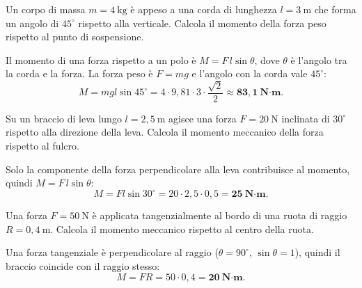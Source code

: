 
\begin{question}[ID=6.1, subtitle={Momento del peso su pendolo a 45° dalla verticale}, tags={corpo rigido, momento meccanico}, difficulty=facile]
Un corpo di massa $m = 4\ \text{kg}$ è appeso a una corda di lunghezza $l = 3\ \text{m}$ che forma un angolo di $45^\circ$ rispetto alla verticale. Calcola il momento della forza peso rispetto al punto di sospensione.
\begin{solution}
Il momento di una forza rispetto a un polo è $M = F\,l\sin\theta$, dove $\theta$ è l'angolo tra la corda e la forza. La forza peso è $F = mg$ e l'angolo con la corda vale $45^\circ$:
\[
M = mgl\sin 45^\circ = 4\cdot 9{,}81\cdot 3\cdot \frac{\sqrt{2}}{2} \approx \mathbf{83{,}1\ \text{N·m}}.
\]
\end{solution}
\end{question}


\begin{question}[ID=6.2, subtitle={Momento meccanico di un braccio di leva a 30°}, tags={corpo rigido, momento meccanico}, difficulty=facile]
Su un braccio di leva lungo $l = 2{,}5\ \text{m}$ agisce una forza $F = 20\ \text{N}$ inclinata di $30^\circ$ rispetto alla direzione della leva. Calcola il momento meccanico della forza rispetto al fulcro.
\begin{solution}
Solo la componente della forza perpendicolare alla leva contribuisce al momento, quindi $M = F\,l\sin\theta$:
\[
M = Fl\sin 30^\circ = 20\cdot 2{,}5\cdot 0{,}5 = \mathbf{25\ \text{N·m}}.
\]
\end{solution}
\end{question}


\begin{question}[ID=6.3, subtitle={Momento meccanico di una forza tangenziale su una ruota}, tags={corpo rigido, momento meccanico}, difficulty=facile]
Una forza $F = 50\ \text{N}$ è applicata tangenzialmente al bordo di una ruota di raggio $R = 0{,}4\ \text{m}$. Calcola il momento meccanico rispetto al centro della ruota.
\begin{solution}
Una forza tangenziale è perpendicolare al raggio ($\theta = 90^\circ$, $\sin\theta = 1$), quindi il braccio coincide con il raggio stesso:
\[
M = FR = 50\cdot 0{,}4 = \mathbf{20\ \text{N·m}}.
\]
\end{solution}
\end{question}

